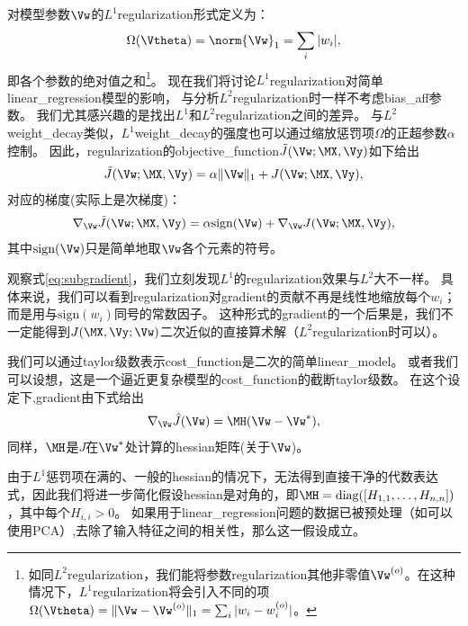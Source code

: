 对模型参数$\Vw$的$L^1$\gls{regularization}形式定义为：
\begin{align}
 \Omega(\Vtheta) = \norm{ \Vw }_1 = \sum_i | w_i |,
 \end{align}
即各个参数的绝对值之和\footnote{如同$L^2$\gls{regularization}，我们能将参数\gls{regularization}其他非零值$\Vw^{(o)}$。在这种情况下，$L^1$\gls{regularization}将会引入不同的项$\Omega(\Vtheta)=
\|\Vw - \Vw^{(o)} \|_1 = \sum_i | w_i - w_i^{(o)} |$。}。
现在我们将讨论$L^1$\gls{regularization}对简单\gls{linear_regression}模型的影响， 与分析$L^2$\gls{regularization}时一样不考虑\gls{bias_aff}参数。  
我们尤其感兴趣的是找出$L^1$和$L^2$\gls{regularization}之间的差异。
与$L^2$\gls{weight_decay}类似，$L^1$\gls{weight_decay}的强度也可以通过缩放惩罚项$\Omega$的正超参数$\alpha$控制。 
因此，\gls{regularization}的\gls{objective_function}$\tilde{J}(\Vw;\MX, \Vy)$如下给出
\begin{align}
\tilde{J}(\Vw;\MX, \Vy) = \alpha \| \Vw \|_1 +  J(\Vw;\MX, \Vy) ,
\end{align}
对应的梯度(实际上是次梯度)：
\begin{align}
\label{eq:subgradient}
  \nabla_{\Vw} \tilde{J}(\Vw; \MX, \Vy) = \alpha \text{sign}(\Vw) + \nabla_{\Vw} J(\Vw; \MX, \Vy), %
\end{align}
其中$\text{sign}(\Vw)$只是简单地取$\Vw$各个元素的符号。


观察式\ref{eq:subgradient}，我们立刻发现$L^1$的\gls{regularization}效果与$L^2$大不一样。
具体来说，我们可以看到\gls{regularization}对\gls{gradient}的贡献不再是线性地缩放每个$w_i$；而是用与$\text{sign}(w_i)$同号的常数因子。
这种形式的\gls{gradient}的一个后果是，我们不一定能得到$J(\MX, \Vy;\Vw)$二次近似的直接算术解（$L^2$\gls{regularization}时可以）。 
 
我们可以通过\gls{taylor}级数表示\gls{cost_function}是二次的简单\gls{linear_model}。
或者我们可以设想，这是一个逼近更复杂模型的\gls{cost_function}的截断\gls{taylor}级数。
在这个设定下,\gls{gradient}由下式给出
\begin{align}
  \nabla_{\Vw} \hat{J}(\Vw) = \MH (\Vw - \Vw^*),
\end{align}
同样，$\MH$是$J$在$\Vw^*$处计算的\gls{hessian}矩阵(关于$\Vw$)。

由于$L^1$惩罚项在满的、一般的\gls{hessian}的情况下，无法得到直接干净的代数表达式，因此我们将进一步简化假设\gls{hessian}是对角的，即$\MH = \text{diag}([H_{1,1},\dots, H_{n,n}])$，其中每个$H_{i,i}>0$。
如果用于\gls{linear_regression}问题的数据已被预处理（如可以使用PCA）,去除了输入特征之间的相关性，那么这一假设成立。

